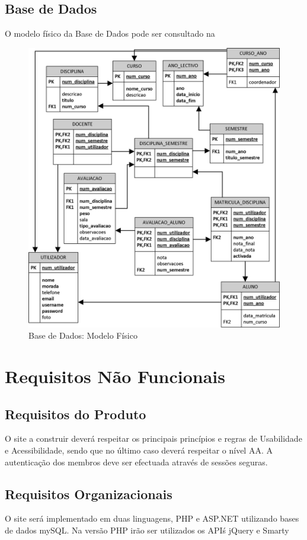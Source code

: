 \subsection{Base de Dados}
O modelo físico da Base de Dados pode ser consultado na 
\begin{figure}[h]
\centering
\includegraphics{imagens/modelofisico.jpg}
\caption{Base de Dados: Modelo Físico}
\label{fig:modelofisico}
\end{figure}
\section{Requisitos Não Funcionais}

\subsection{Requisitos do Produto}
O site a construir deverá respeitar os principais princípios e regras de Usabilidade e Acessibilidade, sendo que no último caso deverá respeitar o nível AA.
A autenticação dos membros deve ser efectuada através de sessões seguras.

\subsection{Requisitos Organizacionais}
O site será implementado em duas linguagens, PHP e ASP.NET utilizando bases de dados mySQL. Na versão PHP irão ser utilizados os API\'s jQuery e Smarty 

